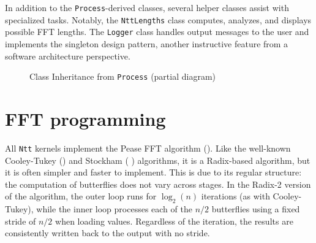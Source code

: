 \documentclass{article}
\begin{document}
In addition to the \texttt{Process}-derived classes, several helper classes assist with specialized tasks. Notably, the \texttt{NttLengths} class computes, analyzes, and displays possible FFT lengths. The \texttt{Logger} class handles output messages to the user and implements the singleton design pattern, another instructive feature from a software architecture perspective.

\begin{figure}
\caption{Class Inheritance from \texttt{Process} (partial diagram)}
\label{fig:ProcessHierarchy}
\end{figure}

\section{FFT programming}

All \texttt{Ntt} kernels implement the Pease FFT algorithm (\cite{Pea68}). Like the well-known Cooley-Tukey (\cite{CT65}) and Stockham (\cite{Sto66} \cite{CCFHKLMNRW67}) algorithms, it is a Radix-based algorithm, but it is often simpler and faster to implement. This is due to its regular structure: the computation of butterflies does not vary across stages. In the Radix-2 version of the algorithm, the outer loop runs for $\log_2(n)$ iterations (as with Cooley-Tukey), while the inner loop processes each of the $n/2$ butterflies using a fixed stride of $n/2$ when loading values. Regardless of the iteration, the results are consistently written back to the output with no stride.
\end{document}
